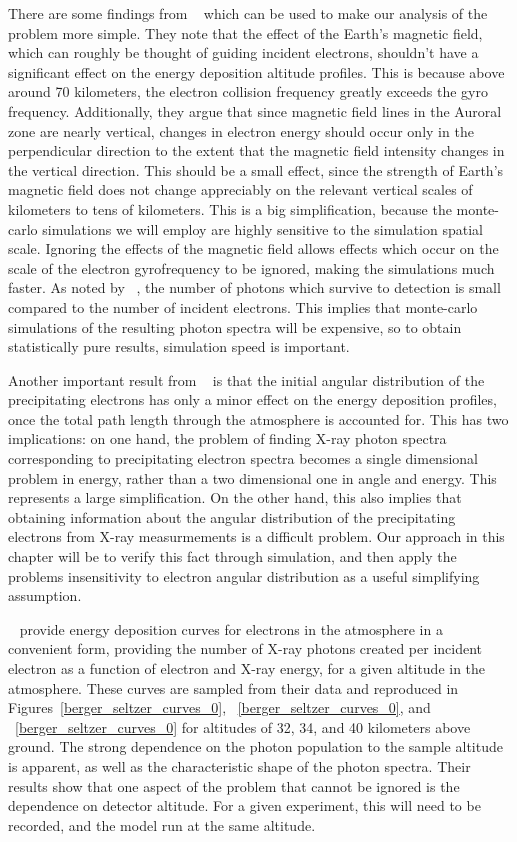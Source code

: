 There are some findings from ~\cite{Rees1963} which can be used to make our analysis of the problem more simple. They note that the effect of the Earth's magnetic field, which can roughly be thought of guiding incident electrons, shouldn't have a significant effect on the energy deposition altitude profiles. This is because above around 70 kilometers, the electron collision frequency greatly exceeds the gyro frequency. Additionally, they argue that since magnetic field lines in the Auroral zone are nearly vertical, changes in electron energy should occur only in the perpendicular direction to the extent that the magnetic field intensity changes in the vertical direction. This should be a small effect, since the strength of Earth's magnetic field does not change appreciably on the relevant vertical scales of kilometers to tens of kilometers. This is a big simplification, because the monte-carlo simulations we will employ are highly sensitive to the simulation spatial scale. Ignoring the effects of the magnetic field allows effects which occur on the scale of the electron gyrofrequency to be ignored, making the simulations much faster. As noted by ~\cite{Berger1972}, the number of photons which survive to detection is small compared to the number of incident electrons. This implies that monte-carlo simulations of the resulting photon spectra will be expensive, so to obtain statistically pure results, simulation speed is important. 

Another important result from ~\cite{Rees1963} is that the initial angular distribution of the precipitating electrons has only a minor effect on the energy deposition profiles, once the total path length through the atmosphere is accounted for. This has two implications: on one hand, the problem of finding X-ray photon spectra corresponding to precipitating electron spectra becomes a single dimensional problem in energy, rather than a two dimensional one in angle and energy. This represents a large simplification. On the other hand, this also implies that obtaining information about the angular distribution of the precipitating electrons from X-ray measurmements is a difficult problem. Our approach in this chapter will be to verify this fact through simulation, and then apply the problems insensitivity to electron angular distribution as a useful simplifying assumption. 

~\cite{Berger1972} provide energy deposition curves for electrons in the atmosphere in a convenient form, providing the number of X-ray photons created per incident electron as a function of electron and X-ray energy, for a given altitude in the atmosphere. These curves are sampled from their data and reproduced in Figures~\ref{berger_seltzer_curves_0}, ~\ref{berger_seltzer_curves_0}, and ~\ref{berger_seltzer_curves_0} for altitudes of 32, 34, and 40 kilometers above ground. The strong dependence on the photon population to the sample altitude is apparent, as well as the characteristic shape of the photon spectra. Their results show that one aspect of the problem that cannot be ignored is the dependence on detector altitude. For a given experiment, this will need to be recorded, and the model run at the same altitude. 

